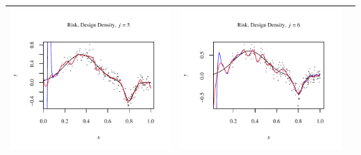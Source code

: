 \documentclass[11pt]{article}
\begin{document}
\begin{table}[h!]
\begin{center}
\begin{tabular}{| >{\centering\arraybackslash}m{2.1in} |  >{\centering\arraybackslash}m{2.1in} |  >{\centering\arraybackslash}m{2.1in}|}
      \includegraphics[width=1\linewidth,height=0.18\textheight]{Graphs/4/2/assignment5_a_4_2_5}&
      \includegraphics[width=1\linewidth,height=0.18\textheight]{Graphs/4/2/assignment5_a_4_2_6}\\\hline
    \end{tabular}
  \end{center}
\end{table}
\end{document}
